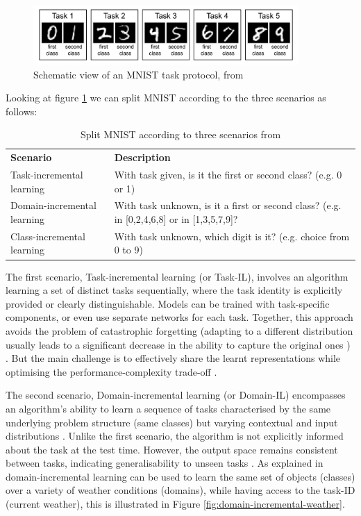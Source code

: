 \begin{figure}[H]
    \centering
    \includegraphics[width=0.9\textwidth]{Images/tasks_example_mnist.png}
    \caption{Schematic view of an MNIST task protocol, from \citep{van2019three}}
    \label{fig:mnistTaskProtocol}
\end{figure}


Looking at figure \ref{fig:mnistTaskProtocol} we can split MNIST according to the three scenarios as follows: 
\begin{table}[H]
\begin{tabularx}{0.9\textwidth}{l | X }
    \textbf{Scenario} & \textbf{Description} \\
     Task-incremental learning & With task given, is it the first or second class? (e.g. 0 or 1)  \\
     Domain-incremental learning & With task unknown, is it a first or second class? (e.g. in [0,2,4,6,8] or in [1,3,5,7,9]?\\
     Class-incremental learning & With task unknown, which digit is it? (e.g. choice from 0 to 9)

\end{tabularx}
     \caption{Split MNIST according to three scenarios from \citep{van2019three}}
     \label{tab:mnist_tasks}
\end{table}
The first scenario, Task-incremental learning (or Task-IL), involves an algorithm learning a set of distinct tasks sequentially, where the task identity is explicitly provided or clearly distinguishable. Models can be trained with task-specific components, or even use separate networks for each task. Together, this approach avoids the problem of catastrophic forgetting (adapting to a different distribution usually leads to a significant decrease in the ability to capture the original ones \citep{wang2023comprehensive}) \citep{ruvolo2013ella, masse2018alleviating}. But the main challenge is to effectively share the learnt representations while optimising the performance-complexity trade-off \citep{lopez2017gradient, vogelstein2020representation}. 

The second scenario, Domain-incremental learning (or Domain-IL) encompasses an algorithm's ability to learn a sequence of tasks characterised by the same underlying problem structure (same classes) but varying contextual and input distributions \citep{ke2021classic, mirza2022efficient}. Unlike the first scenario, the algorithm is not explicitly informed about the task at the test time. However, the output space remains consistent between tasks, indicating generalisability to unseen tasks \citep{aljundi2017expert}. 
As explained in \citep{mirza2022efficient} domain-incremental learning can be used to learn the same set of objects (classes) over a variety of weather conditions (domains), while having access to the task-ID (current weather), this is illustrated in Figure \ref{fig:domain-incremental-weather}. 

